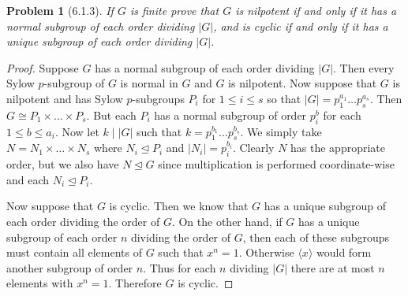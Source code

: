 \documentclass{article}
\newtheorem{problem}{Problem}
\newcommand{\normal}{\unlhd}
\begin{document}
\begin{problem}[6.1.3]
If $G$ is finite prove that $G$ is nilpotent if and only if it has a normal subgroup of each order dividing $|G|$, and is cyclic if and only if it has a unique subgroup of each order dividing $|G|$.
\end{problem}
\begin{proof}
Suppose $G$ has a normal subgroup of each order dividing $|G|$. Then every Sylow $p$-subgroup of $G$ is normal in $G$ and $G$ is nilpotent. Now suppose that $G$ is nilpotent and has Sylow $p$-subgroups $P_i$ for $1 \leq i \leq s$ so that $|G| = p_1^{a_1} \dots p_s^{a_s}$. Then $G \cong P_1 \times \dots \times P_s$. But each $P_i$ has a normal subgroup of order $p_i^{b}$ for each $1 \leq b \leq a_i$. Now let $k \mid |G|$ such that $k = p_1^{b_1} \dots p_s^{b_s}$. We simply take $N = N_1 \times \dots \times N_s$ where $N_i \normal P_i$ and $|N_i| = p_i^{b_i}$. Clearly $N$ has the appropriate order, but we also have $N \normal G$ since multiplication is performed coordinate-wise and each $N_i \normal P_i$.

Now suppose that $G$ is cyclic. Then we know that $G$ has a unique subgroup of each order dividing the order of $G$. On the other hand, if $G$ has a unique subgroup of each order $n$ dividing the order of $G$, then each of these subgroups must contain all elements of $G$ such that $x^n = 1$. Otherwise $\langle x \rangle$ would form another subgroup of order $n$. Thus for each $n$ dividing $|G|$ there are at most $n$ elements with $x^n = 1$. Therefore $G$ is cyclic.
\end{proof}
\end{document}
